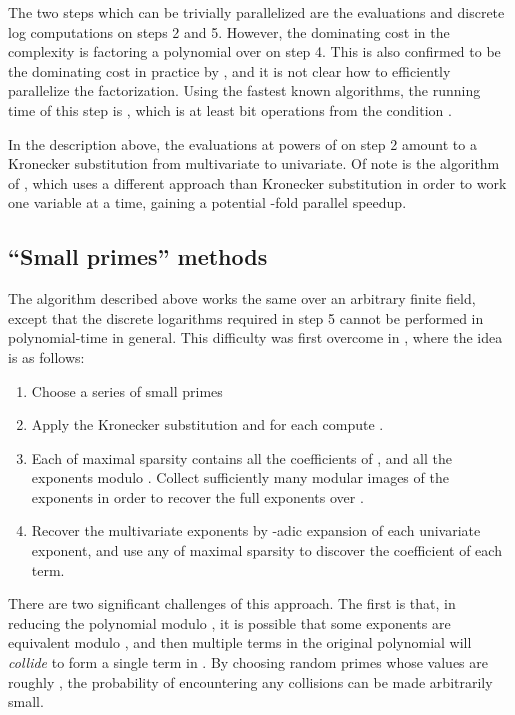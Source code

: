 \documentclass[letterpaper,10pt]{article}
\def\cite{\citep}
\begin{document}
The two steps which can be trivially parallelized are the evaluations
and discrete log computations on steps 2 and 5. However, the dominating
cost in the complexity is factoring a polynomial over  on step
4. This is also confirmed to be the dominating cost in practice by
\cite{HL15}, and it is not clear how to efficiently parallelize the
factorization. Using the fastest known algorithms, the running time of
this step is  \cite{GHL15}, which is at least 
 bit operations from the condition
.

In the description above, the evaluations at powers of  on step 2 amount to a
Kronecker substitution from multivariate to univariate. Of note is
the algorithm of \cite{JM10}, which uses a different approach than
Kronecker substitution in order to work one variable at a time, gaining
a potential -fold parallel speedup.

\subsection{``Small primes'' methods}

The algorithm described above works the same over an arbitrary finite
field, except that the discrete logarithms required in step 5 cannot be
performed in polynomial-time in general. This difficulty was first
overcome in \cite{GS09}, where the idea is as follows:

\begin{enumerate}
  \item Choose a series of small primes 
  \item Apply the Kronecker substitution and for each 
    compute .
  \item Each  of maximal sparsity contains all the coefficients of
    , and all the exponents modulo . Collect sufficiently many
    modular images of the exponents in order to recover the full
    exponents over .
  \item Recover the multivariate exponents by -adic expansion of each
    univariate exponent, and use any  of maximal sparsity to
    discover the coefficient of each term.
\end{enumerate}

There are two significant challenges of this approach. The first is
that, in reducing the polynomial modulo , it is possible that
some exponents are equivalent modulo , and then multiple terms in
the original polynomial will \emph{collide} to form a single term in
. By choosing random primes whose values are roughly
, the probability of encountering any collisions can
be made arbitrarily small.
\end{document}
